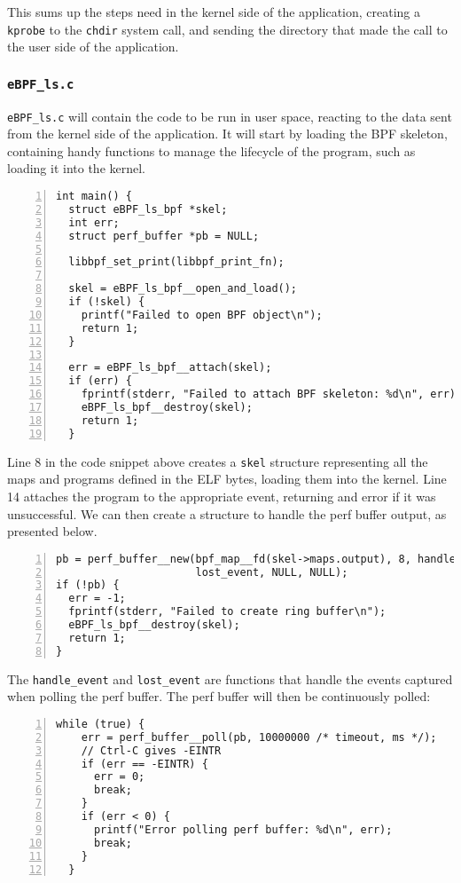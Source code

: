 This sums up the steps need in the kernel side of the application, creating a \texttt{kprobe} to the \texttt{chdir} system call, and sending the directory that made the call to the user side of the application.

\subsubsection{\texttt{eBPF\_ls.c}}
\texttt{eBPF\_ls.c} will contain the code to be run in user space, reacting to the data sent from the kernel side of the application. It will start by loading the BPF skeleton, containing handy functions to manage the lifecycle of the program, such as loading it into the kernel.
\begin{lstlisting}[numbers=left]
int main() {
  struct eBPF_ls_bpf *skel;
  int err;
  struct perf_buffer *pb = NULL;

  libbpf_set_print(libbpf_print_fn);

  skel = eBPF_ls_bpf__open_and_load();
  if (!skel) {
    printf("Failed to open BPF object\n");
    return 1;
  }

  err = eBPF_ls_bpf__attach(skel);
  if (err) {
    fprintf(stderr, "Failed to attach BPF skeleton: %d\n", err);
    eBPF_ls_bpf__destroy(skel);
    return 1;
  }

\end{lstlisting}

Line 8 in the code snippet above creates a \texttt{skel} structure representing all the maps and programs defined in the ELF bytes, loading them into the kernel. Line 14 attaches the program to the appropriate event, returning and error if it was unsuccessful.
We can then create a structure to handle the perf buffer output, as presented below.
\begin{lstlisting}[numbers=left]
pb = perf_buffer__new(bpf_map__fd(skel->maps.output), 8, handle_event,
                      lost_event, NULL, NULL);
if (!pb) {
  err = -1;
  fprintf(stderr, "Failed to create ring buffer\n");
  eBPF_ls_bpf__destroy(skel);
  return 1;
}
\end{lstlisting}
The \texttt{handle\_event} and \texttt{lost\_event} are functions that handle the events captured when polling the perf buffer.
The perf buffer will then be continuously polled:
\begin{lstlisting}[numbers=left]
while (true) {
    err = perf_buffer__poll(pb, 10000000 /* timeout, ms */);
    // Ctrl-C gives -EINTR
    if (err == -EINTR) {
      err = 0;
      break;
    }
    if (err < 0) {
      printf("Error polling perf buffer: %d\n", err);
      break;
    }
  }
\end{lstlisting}

